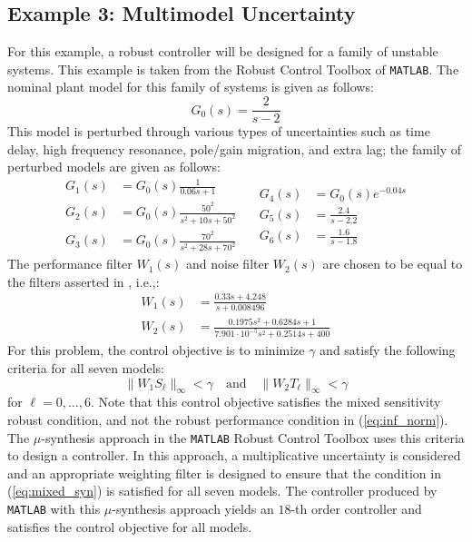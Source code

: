 \documentclass[letterpaper, 10 pt, conference]{ieeeconf}  %
\begin{document}
\subsection{Example 3: Multimodel Uncertainty}
For this example, a robust controller will be designed for a family of unstable systems. This example is taken from the Robust Control Toolbox of \texttt{MATLAB}. The nominal plant model for this family of systems is given as follows:
\begin{equation}
G_0(s) = \frac{2}{s-2}
\end{equation}
This model is perturbed through various types of uncertainties such as time delay, high frequency resonance, pole/gain migration, and extra lag; the family of perturbed models are given as follows:
\begin{equation}
  \begin{split}
    G_1(s) &= G_0(s) \frac{1}{0.06s+1}\\       
    G_2(s) &= G_0(s) \frac{50^2}{s^2+10s+50^2}\\        
    G_3(s) &= G_0(s) \frac{70^2}{s^2+28s+70^2}
  \end{split}
\quad  
  \begin{split}
    G_4(s) &= G_0(s)e^{-0.04s}\\        
    G_5(s) &= \frac{2.4}{s-2.2}\\        
    G_6(s) &= \frac{1.6}{s-1.8}
  \end{split}
\end{equation}
The performance filter $W_1(s)$ and noise filter $W_2(s)$ are chosen to be equal to the filters asserted in \cite{Kar13}, i.e.,:
\begin{equation}
  \begin{split}
    W_1(s) &= \frac{0.33s+4.248}{s+0.008496}\\       
    W_2(s) &= \frac{0.1975s^2+0.6284s+1}{7.901\cdot 10^{-5}s^2+0.2514s+400}
  \end{split}
\end{equation}
For this problem, the control objective is to minimize $\gamma$ and satisfy the following criteria for all seven models:
\begin{equation} \label{eq:mixed_syn}
\|W_1S_{\ell} \|_{\infty} < \gamma \quad \mbox{and} \quad \|W_2T_{\ell} \|_{\infty} < \gamma
\end{equation}
for ${\ell} = 0,\ldots,6$. Note that this control objective satisfies the mixed sensitivity robust condition, and not the robust performance condition in (\ref{eq:inf_norm}). The $\mu$-synthesis approach in the \texttt{MATLAB} Robust Control Toolbox uses this criteria to design a controller. In this approach, a multiplicative uncertainty is considered and an appropriate weighting filter is designed to ensure that the condition in (\ref{eq:mixed_syn}) is satisfied for all seven models. The controller produced by \texttt{MATLAB} with this $\mu$-synthesis approach yields an $18$-th order controller and satisfies the control objective for all models. 
\end{document}
